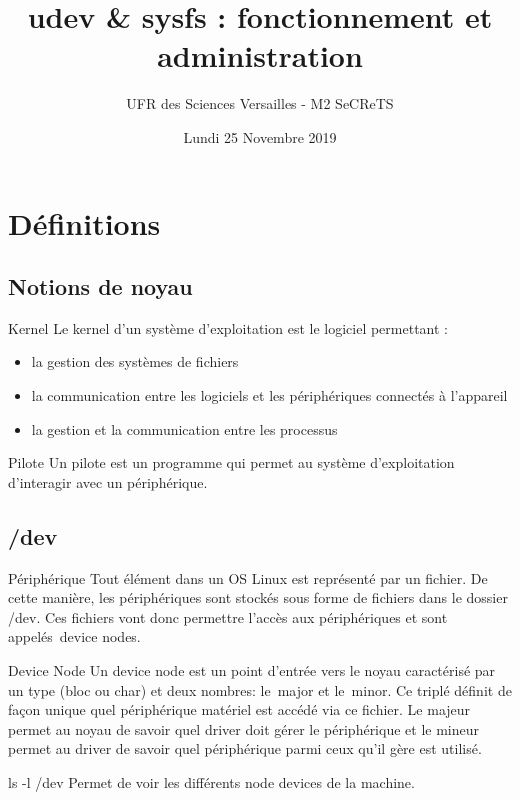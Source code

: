 \documentclass{beamer}
\title{udev \& sysfs : fonctionnement et administration}
\author{UFR des Sciences Versailles - M2 SeCReTS}
\institute{CAUMES Clément \& DEBROUASSE Kevin \& \\ HEQUET Jonathan \& Mehdi MTALSI-MERIMI}
\date{Lundi 25 Novembre 2019}
\begin{document}
  \begin{frame}
  \titlepage
  \end{frame}

\section{Définitions}

\subsection{Notions de noyau}

 \begin{frame}
	\begin{block}{Kernel} 
	Le kernel d'un système d'exploitation est le logiciel permettant : 
	\begin{itemize}
		[circle]
		\item la gestion des systèmes de fichiers
		\item la communication entre les logiciels et les périphériques connectés à l'appareil
		\item la gestion et la communication entre les processus
	\end{itemize}
	\end{block}

	\begin{block}{Pilote} 
		Un pilote est un programme qui permet au système d'exploitation d'interagir avec un périphérique.
	\end{block}


\end{frame}

\subsection{/dev}
 \begin{frame}
	\begin{block}{Périphérique} 
		Tout élément dans un OS Linux est représenté par un fichier. De cette manière, les périphériques sont stockés sous forme de fichiers dans le dossier /dev.
		Ces fichiers vont donc permettre l’accès aux périphériques et sont appelés device nodes. 
	\end{block}
    \begin{block}{Device Node}
    	Un device node est un point d’entrée vers le noyau caractérisé par un type (bloc ou char) et deux nombres: le major et le minor. Ce triplé définit de façon unique quel périphérique matériel est accédé via ce fichier. Le majeur permet au noyau de savoir quel driver doit gérer le périphérique et le mineur permet au driver de savoir quel périphérique parmi ceux qu’il gère est utilisé. 
    \end{block}
	\begin{exampleblock}{ls -l /dev} 
		 Permet de voir les différents node devices de la machine.
	\end{exampleblock}
\end{frame}
\end{document}
